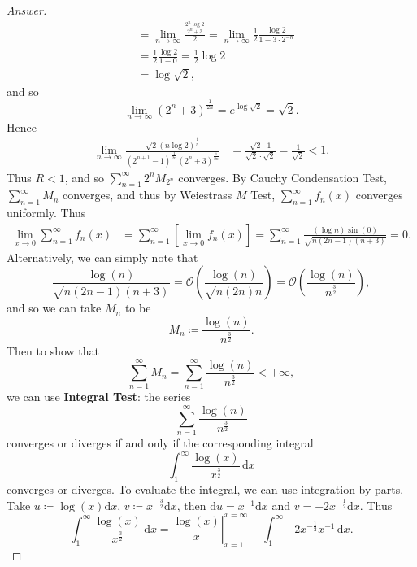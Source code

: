 \documentclass[12pt]{article}
\newcommand\paren[1]{\left( #1 \right)}
\newcommand{\sqbrack}[1]{\left [ #1 \right ]}
\renewcommand{\i}[4]{\int_{#1}^{#2} {#3} \, \mathrm{d} {#4} }
\newcommand{\rd}{\mathrm{d}}
\theoremstyle{definition}
\begin{document}
\begin{proof}[Answer]
\begin{align*}
        & = \lim\limits_{n \to \infty} \frac{ \frac{2^{n} \log 2}{2^n +3} }{2} = \lim\limits_{n \to \infty} \frac{1}{2} \frac{\log 2}{1 - 3 \cdot 2^{-n}} \\
        & = \frac{1}{2} \frac{\log 2}{1 - 0} = \frac{1}{2} \log 2 \\
        & = \log \sqrt{2},
    \end{align*}
    and so 
    \[
        \lim\limits_{n \to \infty} \paren{ 2^n + 3 }^{\frac{1}{2n} } = e^{\log \sqrt{2}} = \sqrt{2}.
    \]
    Hence
    \begin{align*}
        \lim\limits_{n \to \infty} \frac{ \sqrt{2} \paren{ n \log 2 }^{\frac{1}{n}} }{ \paren{ 2^{n+1} - 1 }^{\frac{1}{2n}} \paren{ 2^n + 3 }^{\frac{1}{2n}} } & = \frac{\sqrt{2} \cdot 1}{\sqrt{2} \cdot \sqrt{2} } = \frac{1}{\sqrt{2}} < 1.
    \end{align*}
    Thus $R < 1$, and so $\sum\limits_{n = 1}^{\infty} 2^n M_{2^n}$ converges. By Cauchy Condensation Test, $\sum\limits_{n = 1}^{\infty} M_n$ converges, and thus by Weiestrass $M$ Test, $\sum\limits_{n = 1}^{\infty} f_n(x)$ converges uniformly. Thus 
    \begin{align*}
        \lim\limits_{x \to 0} \sum\limits_{n = 1}^{\infty} f_n(x) & = \sum\limits_{n = 1}^{\infty} \sqbrack{ \lim\limits_{x \to 0} f_n(x) } = \sum\limits_{n = 1}^{\infty} \frac{(\log n) \sin (0)}{\sqrt{n(2n-1)(n+3)}} = \boxed{ 0 .}
    \end{align*}
    Alternatively, we can simply note that 
    \[
        \frac{\log(n)}{\sqrt{ n (2n-1) (n+3) }} = \mathcal{O} \paren{ \frac{\log(n)}{\sqrt{n(2n)n}} } = \mathcal{O} \paren{ \frac{\log(n)}{n^{\frac{3}{2}}} } , 
    \]
    and so we can take $M_n$ to be 
    \[
        M_n \coloneqq \frac{\log(n)}{n^{\frac{3}{2}}} . 
    \]
    Then to show that 
    \[
        \sum\limits_{n = 1}^{\infty} M_n = \sum\limits_{n = 1}^{\infty} \frac{\log(n)}{n^{\frac{3}{2}}} < +\infty , 
    \]
    we can use \textbf{Integral Test}: the series 
    \[
        \sum\limits_{n = 1}^{\infty} \frac{\log(n)}{n^{\frac{3}{2}}}
    \]
    converges or diverges if and only if the corresponding integral 
    \[
        \i{1}{\infty}{ \frac{\log(x)}{x^{\frac{3}{2}}} }{x}
    \]
    converges or diverges. To evaluate the integral, we can use integration by parts. Take $u \coloneqq \log(x) \rd x$, $v \coloneqq x^{-\frac{3}{2}} \rd x$, then $\rd u = x^{-1} \rd x$ and $v = -2 x^{-\frac{1}{2}} \rd x$. Thus 
    \[
        \i{1}{\infty}{ \frac{\log(x)}{x^{\frac{3}{2}}} }{x} = \left. \frac{\log(x)}{x} \right|_{x = 1}^{x = \infty} - \i{1}{\infty}{-2 x^{-\frac{1}{2}} x^{-1} }{x} . 
\]
\end{proof}
\end{document}
